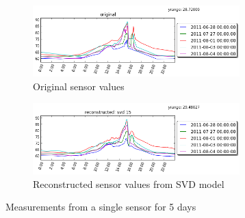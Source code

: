 \begin{figure}
\centering
\begin{subfigure}{8cm}
  \centering
  \includegraphics[width=8cm]{fig-original}
  \caption{Original sensor values}
  \label{fig:results-original}
\end{subfigure}%
\begin{subfigure}{8cm}
  \centering
  \includegraphics[width=8cm]{fig-reconstructed_svd}
  \caption{Reconstructed sensor values from SVD model}
  \label{fig:results-reconstructed-svd}
\end{subfigure}
\caption{Measurements from a single sensor for 5 days}
\label{fig:results}
\end{figure}
